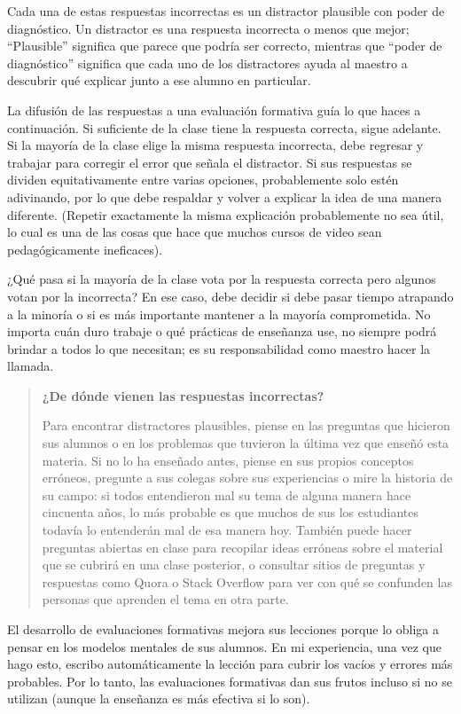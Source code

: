 \documentclass[
]{book}
\begin{document}
Cada una de estas respuestas incorrectas es un distractor plausible con poder de diagnóstico. Un distractor es una respuesta incorrecta o menos que mejor; ``Plausible'' significa que parece que podría ser correcto, mientras que ``poder de diagnóstico'' significa que cada uno de los distractores ayuda al maestro a descubrir qué explicar junto a ese alumno en particular.

La difusión de las respuestas a una evaluación formativa guía lo que haces a continuación. Si suficiente de la clase tiene la respuesta correcta, sigue adelante. Si la mayoría de la clase elige la misma respuesta incorrecta, debe regresar y trabajar para corregir el error que señala el distractor. Si sus respuestas se dividen equitativamente entre varias opciones, probablemente solo estén adivinando, por lo que debe respaldar y volver a explicar la idea de una manera diferente. (Repetir exactamente la misma explicación probablemente no sea útil, lo cual es una de las cosas que hace que muchos cursos de video sean pedagógicamente ineficaces).

¿Qué pasa si la mayoría de la clase vota por la respuesta correcta pero algunos votan por la incorrecta? En ese caso, debe decidir si debe pasar tiempo atrapando a la minoría o si es más importante mantener a la mayoría comprometida. No importa cuán duro trabaje o qué prácticas de enseñanza use, no siempre podrá brindar a todos lo que necesitan; es su responsabilidad como maestro hacer la llamada.

\begin{quote}
\textbf{¿De dónde vienen las respuestas incorrectas?}

Para encontrar distractores plausibles, piense en las preguntas que hicieron sus alumnos o en los problemas que tuvieron la última vez que enseñó esta materia. Si no lo ha enseñado antes, piense en sus propios conceptos erróneos, pregunte a sus colegas sobre sus experiencias o mire la historia de su campo: si todos entendieron mal su tema de alguna manera hace cincuenta años, lo más probable es que muchos de sus los estudiantes todavía lo entenderán mal de esa manera hoy. También puede hacer preguntas abiertas en clase para recopilar ideas erróneas sobre el material que se cubrirá en una clase posterior, o consultar sitios de preguntas y respuestas como Quora o Stack Overflow para ver con qué se confunden las personas que aprenden el tema en otra parte.
\end{quote}

El desarrollo de evaluaciones formativas mejora sus lecciones porque lo obliga a pensar en los modelos mentales de sus alumnos. En mi experiencia, una vez que hago esto, escribo automáticamente la lección para cubrir los vacíos y errores más probables. Por lo tanto, las evaluaciones formativas dan sus frutos incluso si no se utilizan (aunque la enseñanza es más efectiva si lo son).
\end{document}
